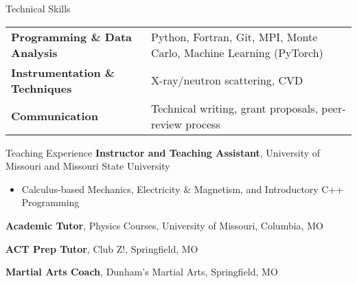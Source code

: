 \documentclass[a4paper,skipsamekey,11pt,english]{curve}
\begin{document}
\begin{rubric}{Technical Skills}
  \begin{tabular}{@{}ll@{}}
    \textbf{Programming \& Data Analysis} & Python, Fortran, Git, MPI, Monte Carlo, Machine Learning (PyTorch) \\
    \textbf{Instrumentation \& Techniques} & X-ray/neutron scattering, CVD\\
    \textbf{Communication} & Technical writing, grant proposals, peer-review process\\
  \end{tabular}
\end{rubric}

\nocite{*}
\printbibliography[heading=subbibliography,title={Journal Articles},type=article]
\printbibliography[heading=subbibliography,title={Conference Proceedings},type=inproceedings]
\printbibliography[heading=subbibliography,title={In Review / In Preparation},keyword=inprep]

\pagebreak

\begin{rubric}{Teaching Experience}
  \entry*[2018--2023]%
    \textbf{Instructor and Teaching Assistant}, University of Missouri and Missouri State University \RMPbadge\par
    \begin{itemize}
      \item Calculus-based Mechanics, Electricity \& Magnetism, and Introductory C++ Programming
    \end{itemize}

  \entry*[2021--Present]%
    \textbf{Academic Tutor}, Physics Courses, University of Missouri, Columbia, MO

  \entry*[2018--2021]%
    \textbf{ACT Prep Tutor}, Club Z!, Springfield, MO

  \entry*[2014--2020]%
    \textbf{Martial Arts Coach}, Dunham’s Martial Arts, Springfield, MO
\end{rubric}
\end{document}
